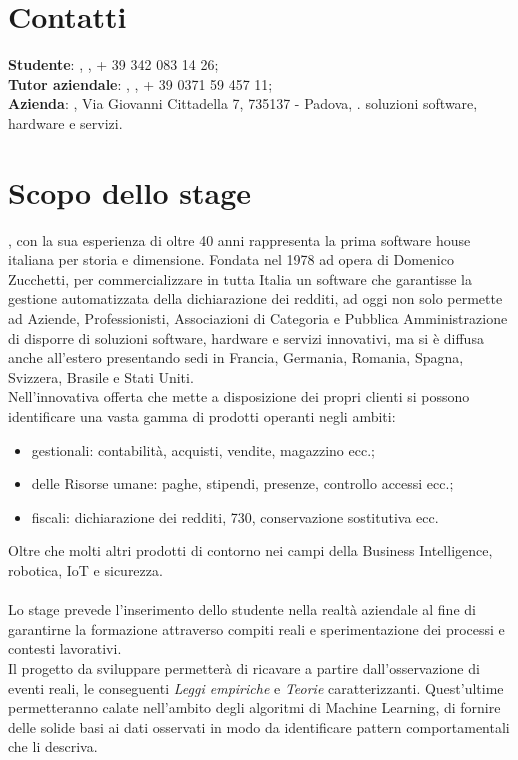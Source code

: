 \section{Contatti}
\textbf{Studente}: \myName, , + 39 342 083 14 26;\\
\textbf{Tutor aziendale}: \Greg, , + 39 0371 59 457 11;\\
\textbf{Azienda}: \myCompany, Via Giovanni Cittadella 7, 735137 - Padova, \sitoCompany.
soluzioni software, hardware e servizi. 

\section{Scopo dello stage}
\textit{\myCompany}, con la sua esperienza di oltre 40 anni rappresenta la prima software house italiana per storia e dimensione. Fondata nel 1978 ad opera di Domenico Zucchetti, per commercializzare in tutta Italia un software che garantisse la gestione automatizzata della dichiarazione dei redditi, ad oggi non solo permette ad Aziende, Professionisti, Associazioni di Categoria e Pubblica Amministrazione di disporre di  soluzioni software, hardware e servizi innovativi, ma si è diffusa anche all'estero presentando sedi in Francia, Germania, Romania, Spagna, Svizzera, Brasile e Stati Uniti.\\ Nell'innovativa offerta che \textit{\myCompany{}} mette a disposizione dei propri clienti si possono identificare una vasta gamma di prodotti operanti negli ambiti:
\begin{itemize}
\item gestionali: contabilità, acquisti, vendite, magazzino ecc.;
\item delle Risorse umane: paghe, stipendi, presenze, controllo accessi ecc.;
\item fiscali: dichiarazione dei redditi, 730, conservazione sostitutiva ecc.
\end{itemize}
Oltre che molti altri prodotti di contorno nei campi della Business Intelligence, robotica, IoT e  sicurezza.
\\\\
Lo stage prevede l'inserimento dello studente nella realtà aziendale al fine di garantirne la formazione attraverso compiti reali e sperimentazione dei processi e contesti lavorativi. \\
Il progetto da sviluppare permetterà di ricavare a partire dall'osservazione di eventi reali, le conseguenti \textit{Leggi empiriche} e \textit{Teorie} caratterizzanti. Quest'ultime permetteranno calate nell'ambito degli algoritmi di Machine Learning, di fornire delle solide basi ai dati osservati in modo da identificare pattern comportamentali che li descriva.
